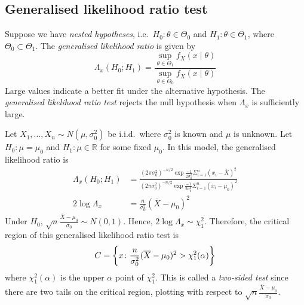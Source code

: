 \subsection{Generalised likelihood ratio test}
\begin{definition}
	Suppose we have \textit{nested hypotheses}, i.e.\ \( H_0 \colon \theta \in \Theta_0 \) and \( H_1 \colon \theta \in \Theta_1 \), where \( \Theta_0 \subset \Theta_1 \).
	The \textit{generalised likelihood ratio} is given by
	\[
		\Lambda_x(H_0; H_1) = \frac{\sup_{\theta \in \Theta_1} f_X(x \mid \theta)}{\sup_{\theta \in \Theta_0} f_X(x \mid \theta)}
	\]
	Large values indicate a better fit under the alternative hypothesis.
	The \textit{generalised likelihood ratio test} rejects the null hypothesis when \( \Lambda_x \) is sufficiently large.
\end{definition}
\begin{example}
	Let \( X_1, \dots, X_n \sim N(\mu, \sigma_0^2) \) be i.i.d.\ where \( \sigma_0^2 \) is known and \( \mu \) is unknown.
	Let \( H_0 \colon \mu = \mu_0 \) and \( H_1 \colon \mu \in \mathbb R \) for some fixed \( \mu_0 \).
	In this model, the generalised likelihood ratio is
	\begin{align*}
		\Lambda_x(H_0; H_1) & = \frac{(2 \pi \sigma_0^2)^{-n/2} \exp{\frac{-1}{2\sigma_0^2} \Sigma_{i=1}^n (x_i - \overline X)^2}}{(2 \pi \sigma_0^2)^{-n/2} \exp{\frac{-1}{2\sigma_0^2} \Sigma_{i=1}^n (x_i - \mu_0)^2}} \\
		2\log \Lambda_x     & = \frac{n}{\sigma_0^2}(\overline X - \mu_0)^2
	\end{align*}
	Under \( H_0 \), \( \sqrt{n} \frac{\overline X - \mu_0}{\sigma_0} \sim N(0,1) \).
	Hence, \( 2 \log \Lambda_x \sim \chi_1^2 \).
	Therefore, the critical region of this generalised likelihood ratio test is
	\[
		C = \qty{x \colon \frac{n}{\sigma_0^2}(\overline X - \mu_0)^2 > \chi_1^2(\alpha)}
	\]
	where \( \chi_1^2(\alpha) \) is the upper \( \alpha \) point of \( \chi_1^2 \).
	This is called a \textit{two-sided test} since there are two tails on the critical region, plotting with respect to \( \sqrt{n} \frac{\overline X - \mu_0}{\sigma_0} \).
\end{example}

